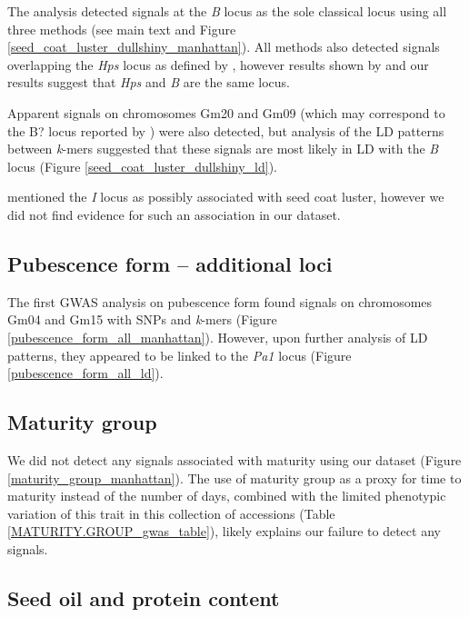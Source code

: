 \documentclass[12pt]{report}
\begin{document}
The analysis detected signals at the \emph{B} locus as the sole classical locus
using all three methods (see main text and Figure
\ref{seed_coat_luster_dullshiny_manhattan}).  All methods also detected signals
overlapping the \emph{Hps} locus as defined by \cite{bandillo2017}, however
results shown by \cite{gijzen2003} and our results suggest that \emph{Hps} and
\emph{B} are the same locus. 

Apparent signals on chromosomes Gm20 and Gm09 (which may correspond to the B?
locus reported by \cite{bandillo2017}) were also detected, but analysis of the
LD patterns between \emph{k}-mers suggested that these signals are most likely
in LD with the \emph{B} locus (Figure \ref{seed_coat_luster_dullshiny_ld}).

\cite{bandillo2017} mentioned the \textit{I} locus as possibly associated
with seed coat luster, however we did not find evidence for such an association
in our dataset.

\subsection*{Pubescence form -- additional loci}
\label{sv-gwas-pubesence-form}

The first GWAS analysis on pubescence form found signals on chromosomes Gm04
and Gm15 with SNPs and \emph{k}-mers (Figure
\ref{pubescence_form_all_manhattan}). However, upon further analysis of LD
patterns, they appeared to be linked to the \emph{Pa1} locus (Figure
\ref{pubescence_form_all_ld}).


\subsection*{Maturity group}
\label{annexe-sv-gwas-maturity}

We did not detect any signals associated with maturity using our dataset
(Figure \ref{maturity_group_manhattan}). The use of maturity group as a proxy
for time to maturity instead of the number of days, combined with the limited
phenotypic variation of this trait in this collection of accessions (Table
\ref{MATURITY.GROUP_gwas_table}), likely explains our failure to detect
any signals.

\subsection*{Seed oil and protein content}
\label{sv-gwas-seed-oil-protein-content}
\end{document}
